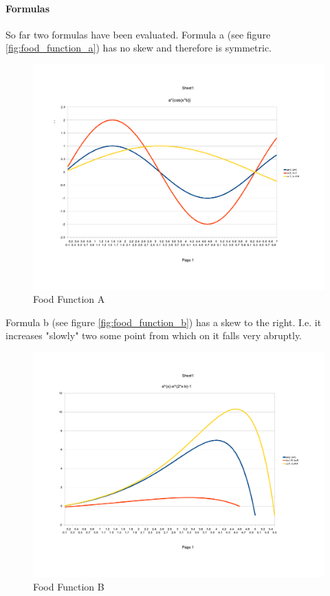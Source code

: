 \newpage
\paragraph{Formulas}
So far two formulas have been evaluated.
Formula a (see figure \vref{fig:food_function_a}) has no skew and therefore is
symmetric. 

\begin{figure}[htb]
\centering
\includegraphics[scale=0.4]{images/food_function_a}
\caption{Food Function A}
\label{fig:food_function_a}
\end{figure}

Formula b (see figure \vref{fig:food_function_b}) has a skew to the right. I.e.
it increases "slowly" two some point from which on it falls very abruptly. 

\begin{figure}[htb]
\centering
\includegraphics[scale=0.4]{images/food_function_b}
\caption{Food Function B}
\label{fig:food_function_b}
\end{figure}

